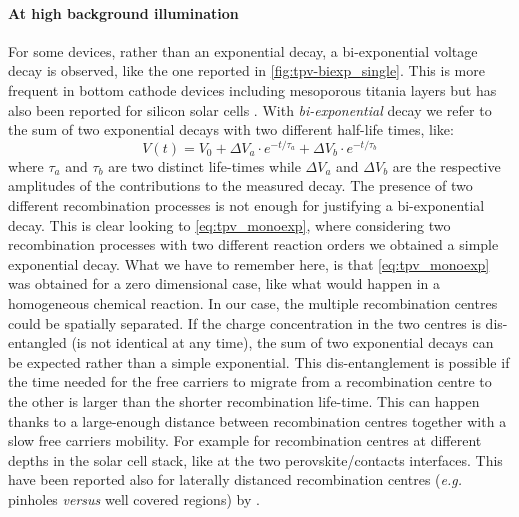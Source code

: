 		\paragraph{At high background illumination}
		For some devices, rather than an exponential decay, a bi\hyp{}exponential voltage decay is observed, like the one reported in \cref{fig:tpv-biexp_single}.
		This is more frequent in bottom cathode devices including mesoporous titania layers \cite{Carnie2015,ORegan2015b} but has also been reported for silicon solar cells \cite{Kiermasch2018}.
		With \emph{bi\hyp{}exponential} decay we refer to the sum of two exponential decays with two different half\hyp{}life times, like:
		\begin{equation}\label{eq:tpv_biexp}
			V (t) = V_0 + \Delta V_a \cdot e^{-t/\tau_a} + \Delta V_b \cdot e^{-t/\tau_b}
		\end{equation}
		where $\tau_a$ and $\tau_b$ are two distinct life\hyp{}times while $\Delta V_a$ and $\Delta V_b$ are the respective amplitudes of the contributions to the measured decay.
		The presence of two different recombination processes is not enough for justifying a bi\hyp{}exponential decay.
		This is clear looking to \cref{eq:tpv_monoexp}, where considering two recombination processes with two different reaction orders we obtained a simple exponential decay.
		What we have to remember here, is that \cref{eq:tpv_monoexp} was obtained for a zero dimensional case, like what would happen in a homogeneous chemical reaction.
		In our case, the multiple recombination centres could be spatially separated.
		If the charge concentration in the two centres is dis\hyp{}entangled (is not identical at any time), the sum of two exponential decays can be expected rather than a simple exponential.
		This dis\hyp{}entanglement is possible if the time needed for the free carriers to migrate from a recombination centre to the other is larger than the shorter recombination life\hyp{}time.
		This can happen thanks to a large\hyp{}enough distance between recombination centres together with a slow free carriers mobility.
		For example for recombination centres at different depths in the solar cell stack, like at the two perovskite/contacts interfaces.
		This have been reported also for laterally distanced recombination centres (\textsl{e.g.} pinholes \textsl{versus} well covered regions) by .

